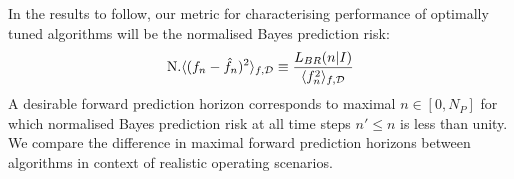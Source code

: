 In the results to follow, our metric for characterising performance of optimally tuned algorithms will be the normalised Bayes prediction risk:
\begin{align}
\text{N.} \langle (f_n - \hat{f}_n)^2 \rangle_{f, \mathcal{D}} \equiv \frac{L_{BR}(n|I)}{\langle f_n^2 \rangle_{f, \mathcal{D}}} 
\end{align}
A desirable forward prediction horizon corresponds to maximal $n \in [0, N_P]$ for which normalised Bayes prediction risk at all time steps $n' \leq n$ is less than unity. We compare the difference in maximal forward prediction horizons between algorithms in context of realistic operating scenarios. 
